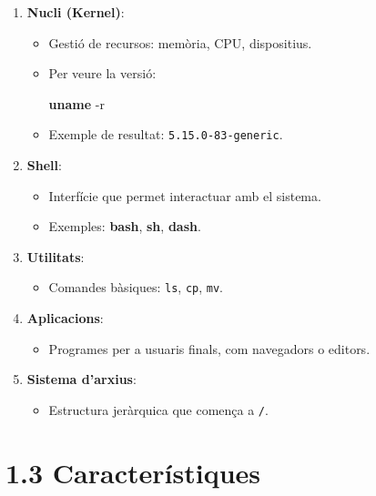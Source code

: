 \documentclass[
  a4paper,
]{article}
\newenvironment{Shaded}{\begin{snugshade}}{\end{snugshade}}
\newcommand{\AttributeTok}[1]{\textcolor[rgb]{0.13,0.29,0.53}{#1}}
\newcommand{\FunctionTok}[1]{\textcolor[rgb]{0.13,0.29,0.53}{\textbf{#1}}}
\providecommand{\tightlist}{%
  \setlength{\itemsep}{0pt}\setlength{\parskip}{0pt}}
\begin{document}
\begin{enumerate}
\def\labelenumi{\arabic{enumi}.}
\tightlist
\item
  \textbf{Nucli (Kernel)}:

  \begin{itemize}
  \item
    Gestió de recursos: memòria, CPU, dispositius.
  \item
    Per veure la versió:

\begin{Shaded}
\begin{Highlighting}[]
\FunctionTok{uname} \AttributeTok{{-}r}
\end{Highlighting}
\end{Shaded}
  \item
    Exemple de resultat: \texttt{5.15.0-83-generic}.
  \end{itemize}
\item
  \textbf{Shell}:

  \begin{itemize}
  \tightlist
  \item
    Interfície que permet interactuar amb el sistema.
  \item
    Exemples: \textbf{bash}, \textbf{sh}, \textbf{dash}.
  \end{itemize}
\item
  \textbf{Utilitats}:

  \begin{itemize}
  \tightlist
  \item
    Comandes bàsiques: \texttt{ls}, \texttt{cp}, \texttt{mv}.
  \end{itemize}
\item
  \textbf{Aplicacions}:

  \begin{itemize}
  \tightlist
  \item
    Programes per a usuaris finals, com navegadors o editors.
  \end{itemize}
\item
  \textbf{Sistema d'arxius}:

  \begin{itemize}
  \tightlist
  \item
    Estructura jeràrquica que comença a \texttt{/}.
  \end{itemize}
\end{enumerate}

\section{1.3 Característiques}\label{caracteruxedstiques}
\end{document}

